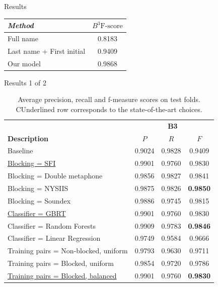 \documentclass{beamer}
\begin{document}

\begin{frame}{Results}

\begin{table}
    \centering
    \begin{tabular}{| l c |}
    \hline
        \textit{Method} & \textit{$B^3 \text{F-score}$}  \\
    \hline
    \hline
    Full name & 0.8183 \\
    Last name + First initial & 0.9409 \\
    \hline
    Our model & {\color{blue} 0.9868} \\
    \hline
    \end{tabular}
\end{table}

\end{frame}


\begin{frame}{Results 1 of 2}

\begin{table}
\caption{Average precision, recall and f-measure scores on test folds. CUnderlined row corresponds to the state-of-the-art choices.}
\centering
\begin{tabular}{|l|c c c |}
  \hline
                       & \multicolumn{3}{|c|}{\textbf{B3}}\\
  \textbf{Description} & $P$ & $R$ & $F$ \\
  \hline
  \hline
Baseline & 0.9024 & 0.9828 & 0.9409  \\
\hline
\underline{Blocking = SFI} & 0.9901 & 0.9760 & 0.9830  \\
Blocking = Double metaphone & 0.9856 & 0.9827 & 0.9841  \\
Blocking = NYSIIS & 0.9875 & 0.9826 & \textbf{0.9850}   \\
Blocking = Soundex & 0.9886 & 0.9745 & 0.9815  \\
\hline
\underline{Classifier = GBRT} & 0.9901 & 0.9760 & 0.9830   \\
Classifier = Random Forests & 0.9909 & 0.9783 & \textbf{0.9846}  \\
Classifier = Linear Regression & 0.9749 & 0.9584 & 0.9666 \\
\hline
Training pairs = Non-blocked, uniform & 0.9793 & 0.9630 & 0.9711   \\
Training pairs = Blocked, uniform & 0.9854 & 0.9720 & 0.9786   \\
\underline{Training pairs = Blocked, balanced} & 0.9901 & 0.9760 & \textbf{0.9830}  \\
\hline

\end{tabular}
\end{table}

\end{frame}
\end{document}

